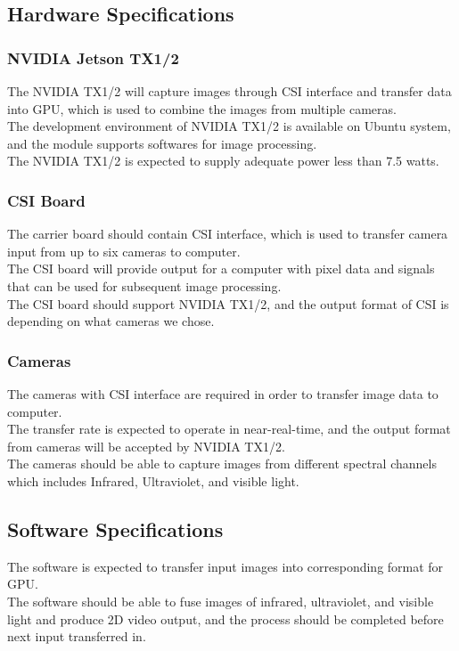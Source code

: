 \documentclass[letterpaper,10pt,serif,draftclsnofoot,onecolumn,compsoc,titlepage]{IEEEtran}
\begin{document}
\subsection{Hardware Specifications}
\subsubsection{NVIDIA Jetson TX1/2}
	The NVIDIA TX1/2 will capture images through CSI interface and transfer data into GPU, which is used to combine the images from multiple cameras.\\ 
	The development environment of NVIDIA TX1/2 is available on Ubuntu system, and the module supports softwares for image processing.\\
	The NVIDIA TX1/2 is expected to supply adequate power less than 7.5 watts.\\

\subsubsection{CSI Board}
	The carrier board should contain CSI interface, which is used to transfer camera input from up to six cameras to computer.\\
	The CSI board will provide output for a computer with pixel data and signals that can be used for subsequent image processing.\\
	The CSI board should support NVIDIA TX1/2, and the output format of CSI is depending on what cameras we chose.\\

\subsubsection{Cameras}
	The cameras with CSI interface are required in order to transfer image data to computer.\\
	The transfer rate is expected to operate in near-real-time, and the output format from cameras will be accepted by NVIDIA TX1/2.\\
	The cameras should be able to capture images from different spectral channels which includes Infrared, Ultraviolet, and visible light.\\
\subsection{Software Specifications}
	The software is expected to transfer input images into corresponding format for GPU.\\
	The software should be able to fuse images of infrared, ultraviolet, and visible light  and produce 2D video output, and the process should be completed before next input transferred in.\\
\end{document}
